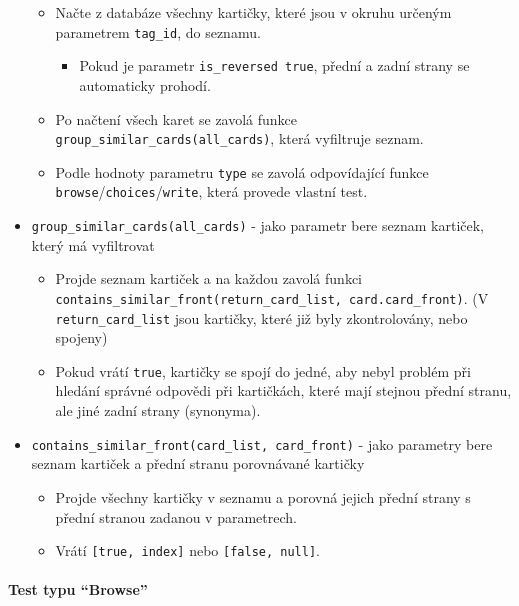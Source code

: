 \documentclass[11pt]{article}
\providecommand{\tightlist}{\setlength{\itemsep}{1pt}\setlength{\parskip}{1pt}}
\let\oldtexttt\texttt
\renewcommand{\texttt}[1]{\oldtexttt{\textcolor{codehighlight}{#1}}}
\begin{document}
\begin{itemize}
  \begin{itemize}
  \tightlist
  \item
    Načte z databáze všechny kartičky, které jsou v okruhu určeným
    parametrem \texttt{tag\_id}, do seznamu.

    \begin{itemize}
    \tightlist
    \item
      Pokud je parametr \texttt{is\_reversed\ true}, přední a zadní
      strany se automaticky prohodí.
    \end{itemize}
  \item
    Po načtení všech karet se zavolá funkce
    \texttt{group\_similar\_cards(all\_cards)}, která vyfiltruje seznam.
  \item
    Podle hodnoty parametru \texttt{type} se zavolá odpovídající funkce
    \texttt{browse}/\texttt{choices}/\texttt{write}, která provede
    vlastní test.
  \end{itemize}
\item
  \texttt{group\_similar\_cards(all\_cards)} - jako parametr bere seznam
  kartiček, který má vyfiltrovat

  \begin{itemize}
  \tightlist
  \item
    Projde seznam kartiček a na každou zavolá funkci
    \texttt{contains\_similar\_front(return\_card\_list,\ card.card\_front)}.
    (V \texttt{return\_card\_list} jsou kartičky, které již byly
    zkontrolovány, nebo spojeny)
  \item
    Pokud vrátí \texttt{true}, kartičky se spojí do jedné, aby nebyl
    problém při hledání správné odpovědi při kartičkách, které mají
    stejnou přední stranu, ale jiné zadní strany (synonyma).
  \end{itemize}
\item
  \texttt{contains\_similar\_front(card\_list,\ card\_front)} - jako
  parametry bere seznam kartiček a přední stranu porovnávané kartičky

  \begin{itemize}
  \tightlist
  \item
    Projde všechny kartičky v seznamu a porovná jejich přední strany s
    přední stranou zadanou v parametrech.
  \item
    Vrátí \texttt{{[}true,\ index{]}} nebo \texttt{{[}false,\ null{]}}.
  \end{itemize}
\end{itemize}

\hypertarget{test-typu-browse}{%
\paragraph{Test typu ``Browse''}\label{test-typu-browse}}
\end{document}
